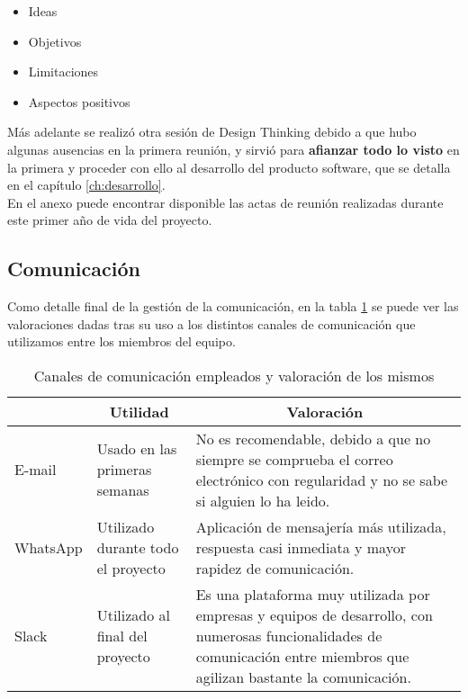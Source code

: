 \begin{itemize}
    \item Ideas
    \item Objetivos
    \item Limitaciones
    \item Aspectos positivos
\end{itemize}

Más adelante se realizó otra sesión de Design Thinking debido a que hubo algunas ausencias en la primera reunión, y sirvió para \textbf{afianzar todo lo visto} en la primera y proceder con ello al desarrollo del producto software, que se detalla en el capítulo \ref{ch:desarrollo}.\\

En el anexo puede encontrar disponible las actas de reunión realizadas durante este primer año de vida del proyecto.

\subsection{Comunicación}
Como detalle final de la gestión de la comunicación, en la tabla \ref{canalescomunicacion} se puede ver las valoraciones dadas tras su uso a los distintos canales de comunicación que utilizamos entre los miembros del equipo.

\begin{table}
    \begin{center}
        \begin{tabular}{|l|p{3cm}|p{5cm}|}
            \hline
                \rowcolor{Gray}\multicolumn{1}{|c|}{\textbf{Canal}}
                & \multicolumn{1}{|c|}{\textbf{Utilidad}} & \multicolumn{1}{|c|}{\textbf{Valoración}} \\
            \hline
                E-mail & Usado en las primeras semanas & No es recomendable, debido a que no siempre se comprueba el correo electrónico con regularidad y no se sabe si alguien lo ha leido. \\
            \hline
                WhatsApp \cite{whatsapp} & Utilizado durante todo el proyecto & Aplicación de mensajería más utilizada, respuesta casi inmediata y mayor rapidez de comunicación. \\
            \hline
                Slack \cite{slack} & Utilizado al final del proyecto & Es una plataforma muy utilizada por empresas y equipos de desarrollo, con numerosas funcionalidades de comunicación entre miembros que agilizan bastante la comunicación. \\
            \hline
        \end{tabular}

        \caption{Canales de comunicación empleados y valoración de los mismos}
        \label{canalescomunicacion}
    \end{center}
\end{table}

